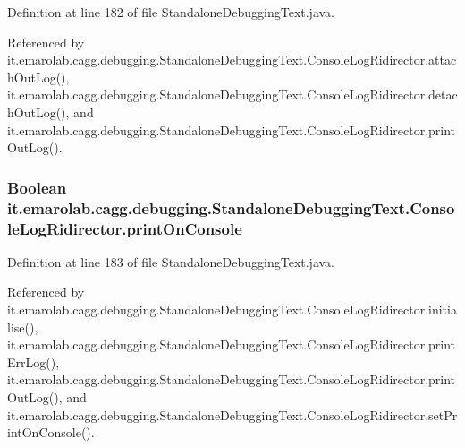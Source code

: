 Definition at line 182 of file Standalone\-Debugging\-Text.\-java.



Referenced by it.\-emarolab.\-cagg.\-debugging.\-Standalone\-Debugging\-Text.\-Console\-Log\-Ridirector.\-attach\-Out\-Log(), it.\-emarolab.\-cagg.\-debugging.\-Standalone\-Debugging\-Text.\-Console\-Log\-Ridirector.\-detach\-Out\-Log(), and it.\-emarolab.\-cagg.\-debugging.\-Standalone\-Debugging\-Text.\-Console\-Log\-Ridirector.\-print\-Out\-Log().

\hypertarget{classit_1_1emarolab_1_1cagg_1_1debugging_1_1StandaloneDebuggingText_1_1ConsoleLogRidirector_ac20283258cc8819bfb23d5ae5aed23f9}{
\subsubsection[{print\-On\-Console}]{\setlength{\rightskip}{0pt plus 5cm}Boolean it.\-emarolab.\-cagg.\-debugging.\-Standalone\-Debugging\-Text.\-Console\-Log\-Ridirector.\-print\-On\-Console\hspace{0.3cm}{\ttfamily [private]}}}\label{classit_1_1emarolab_1_1cagg_1_1debugging_1_1StandaloneDebuggingText_1_1ConsoleLogRidirector_ac20283258cc8819bfb23d5ae5aed23f9}


Definition at line 183 of file Standalone\-Debugging\-Text.\-java.



Referenced by it.\-emarolab.\-cagg.\-debugging.\-Standalone\-Debugging\-Text.\-Console\-Log\-Ridirector.\-initialise(), it.\-emarolab.\-cagg.\-debugging.\-Standalone\-Debugging\-Text.\-Console\-Log\-Ridirector.\-print\-Err\-Log(), it.\-emarolab.\-cagg.\-debugging.\-Standalone\-Debugging\-Text.\-Console\-Log\-Ridirector.\-print\-Out\-Log(), and it.\-emarolab.\-cagg.\-debugging.\-Standalone\-Debugging\-Text.\-Console\-Log\-Ridirector.\-set\-Print\-On\-Console().

